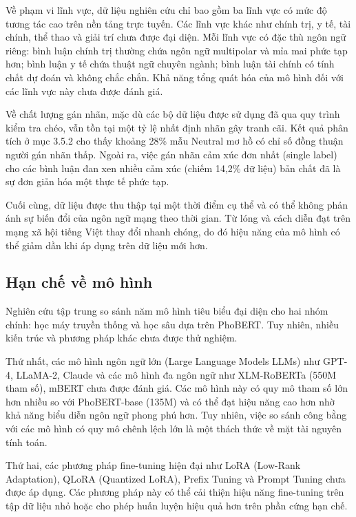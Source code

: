 \documentclass[14pt, a4paper]{report}
\begin{document}
Về phạm vi lĩnh vực, dữ liệu nghiên cứu chỉ bao gồm ba lĩnh vực có mức độ tương tác cao trên nền tảng trực tuyến. Các lĩnh vực khác như chính trị, y tế, tài chính, thể thao và giải trí chưa được đại diện. Mỗi lĩnh vực có đặc thù ngôn ngữ riêng: bình luận chính trị thường chứa ngôn ngữ multipolar và mỉa mai phức tạp hơn; bình luận y tế chứa thuật ngữ chuyên ngành; bình luận tài chính có tính chất dự đoán và không chắc chắn. Khả năng tổng quát hóa của mô hình đối với các lĩnh vực này chưa được đánh giá.


Về chất lượng gán nhãn, mặc dù các bộ dữ liệu được sử dụng đã qua quy trình kiểm tra chéo, vẫn tồn tại một tỷ lệ nhất định nhãn gây tranh cãi. Kết quả phân tích ở mục 3.5.2 cho thấy khoảng 28\% mẫu Neutral mơ hồ có chỉ số đồng thuận người gán nhãn thấp. Ngoài ra, việc gán nhãn cảm xúc đơn nhất (single label) cho các bình luận đan xen nhiều cảm xúc (chiếm 14,2\% dữ liệu) bản chất đã là sự đơn giản hóa một thực tế phức tạp.


Cuối cùng, dữ liệu được thu thập tại một thời điểm cụ thể và có thể không phản ánh sự biến đổi của ngôn ngữ mạng theo thời gian. Từ lóng và cách diễn đạt trên mạng xã hội tiếng Việt thay đổi nhanh chóng, do đó hiệu năng của mô hình có thể giảm dần khi áp dụng trên dữ liệu mới hơn.


\subsection{Hạn chế về mô hình}


Nghiên cứu tập trung so sánh năm mô hình tiêu biểu đại diện cho hai nhóm chính: học máy truyền thống và học sâu dựa trên PhoBERT. Tuy nhiên, nhiều kiến trúc và phương pháp khác chưa được thử nghiệm.


Thứ nhất, các mô hình ngôn ngữ lớn (Large Language Models \- LLMs) như GPT-4, LLaMA-2, Claude và các mô hình đa ngôn ngữ như XLM-RoBERTa (550M tham số), mBERT chưa được đánh giá. Các mô hình này có quy mô tham số lớn hơn nhiều so với PhoBERT-base (135M) và có thể đạt hiệu năng cao hơn nhờ khả năng biểu diễn ngôn ngữ phong phú hơn. Tuy nhiên, việc so sánh công bằng với các mô hình có quy mô chênh lệch lớn là một thách thức về mặt tài nguyên tính toán.


Thứ hai, các phương pháp fine-tuning hiện đại như LoRA (Low-Rank Adaptation), QLoRA (Quantized LoRA), Prefix Tuning và Prompt Tuning chưa được áp dụng. Các phương pháp này có thể cải thiện hiệu năng fine-tuning trên tập dữ liệu nhỏ hoặc cho phép huấn luyện hiệu quả hơn trên phần cứng hạn chế.
\end{document}
